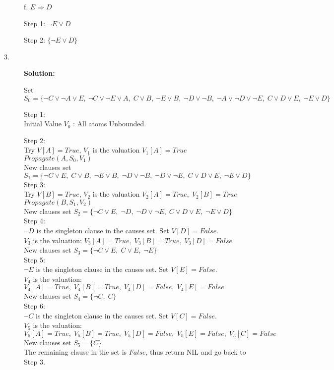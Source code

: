 \documentclass{article}
\begin{document}
\begin{description}
f.
$ E \Rightarrow D $

Step 1:
$ \neg E \vee D $

Step 2:
$ \{ \neg E \vee D \} $


\item[3. ] \textbf{Solution:}

Set $S_{0}= \{\neg C \vee \neg A \vee E , \: \neg C \vee \neg E \vee A,\; C \vee B, \: \neg E \vee B,\;\neg D \vee \neg B,\;\neg A \vee \neg D \vee \neg E,\;C \vee D \vee E,\;\neg E \vee D\} $

Step 1:\\ Initial Value $ V_{0}$ : All atoms Unbounded.

Step 2:\\
Try $V[A]=True$, $V_{1}$ is the valuation $V_{1}[A]=True$\\
$Propagate(A,S_{0},V_{1})$\\
New clauses set $S_{1}=\{\neg C \vee E,\; C\vee B,\; \neg E \vee B,\; \neg D\vee \neg B,\; \neg D\vee \neg E, \; C\vee D\vee E ,\; \neg E\vee D\}$ \\

Step 3:\\
Try $V[B]=True$, $V_{2}$ is the valuation $V_{2}[A]=True,\; V_{2}[B]=True$\\
$Propagate(B,S_{1},V_{2})$\\
New clauses set $ S_{2}=\{ \neg C\vee E,\; \neg D,\; \neg D\vee \neg E, \; C\vee D\vee E ,\; \neg E\vee D \} $\\

Step 4:\\
$ \neg D $ is the singleton clause in the causes set. Set $V[D]=False$.\\
$V_{3}$ is the valuation: $ V_{3}[A]=True,\; V_{3}[B]=True,\; V_{3}[D]=False $\\
New clauses set $ S_{3}=\{ \neg C \vee E,\; C\vee E,\; \neg E \} $\\

Step 5:\\
$ \neg E $ is the singleton clause in the causes set. Set $V[E]=False$.\\
$V_{4}$ is the valuation: $ V_{4}[A]=True,\; V_{4}[B]=True,\; V_{4}[D]=False,\; V_{4}[E]=False $\\
New clauses set $ S_{4}=\{ \neg C,\; C \} $\\

Step 6:\\
$ \neg C $ is the singleton clause in the causes set. Set $V[C]=False$.\\
$V_{5}$ is the valuation: $ V_{5}[A]=True,\; V_{5}[B]=True,\; V_{5}[D]=False,\; V_{5}[E]=False,\; V_{5}[C]=False $\\
New clauses set $ S_{5}=\{C\} $\\
The remaining clause in the set is $False$, thus return NIL and go back to Step 3.\\


\end{description}
\end{document}
